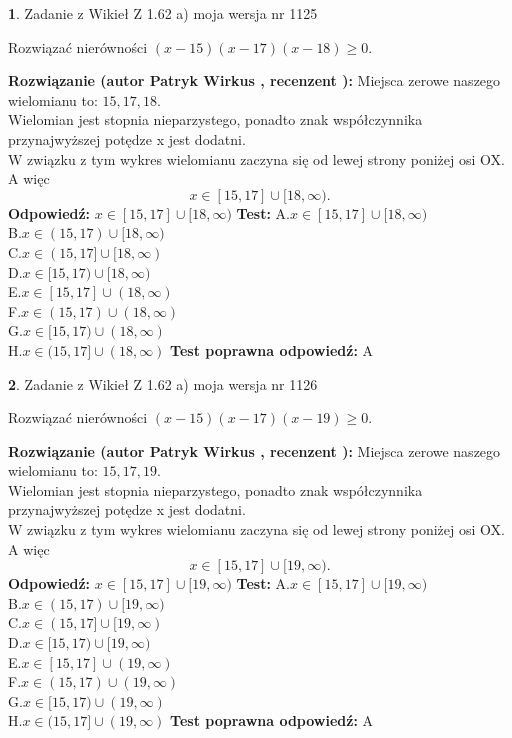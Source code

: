 \documentclass[12pt, a4paper]{article}
\theoremstyle{definition} %
\newtheorem{zad}{}
\newcommand{\zadStart}[1]{\begin{zad}#1\newline}
\newcommand{\zadStop}{\end{zad}}
\newcommand{\rozwStart}[2]{\noindent \textbf{Rozwiązanie (autor #1 , recenzent #2): }\newline}
\newcommand{\rozwStop}{\newline}
\newcommand{\odpStart}{\noindent \textbf{Odpowiedź:}\newline}
\newcommand{\odpStop}{\newline}
\newcommand{\testStart}{\noindent \textbf{Test:}\newline}
\newcommand{\testStop}{\newline}
\newcommand{\kluczStart}{\noindent \textbf{Test poprawna odpowiedź:}\newline}
\newcommand{\kluczStop}{\newline}
\begin{document}
\zadStart{Zadanie z Wikieł Z 1.62 a) moja wersja nr 1125}

Rozwiązać nierówności $(x-15)(x-17)(x-18)\ge0$.
\zadStop
\rozwStart{Patryk Wirkus}{}
Miejsca zerowe naszego wielomianu to: $15, 17, 18$.\\
Wielomian jest stopnia nieparzystego, ponadto znak współczynnika przy\linebreak najwyższej potędze x jest dodatni.\\ W związku z tym wykres wielomianu zaczyna się od lewej strony poniżej osi OX. A więc $$x \in [15,17] \cup [18,\infty).$$
\rozwStop
\odpStart
$x \in [15,17] \cup [18,\infty)$
\odpStop
\testStart
A.$x \in [15,17] \cup [18,\infty)$\\
B.$x \in (15,17) \cup [18,\infty)$\\
C.$x \in (15,17] \cup [18,\infty)$\\
D.$x \in [15,17) \cup [18,\infty)$\\
E.$x \in [15,17] \cup (18,\infty)$\\
F.$x \in (15,17) \cup (18,\infty)$\\
G.$x \in [15,17) \cup (18,\infty)$\\
H.$x \in (15,17] \cup (18,\infty)$
\testStop
\kluczStart
A
\kluczStop



\zadStart{Zadanie z Wikieł Z 1.62 a) moja wersja nr 1126}

Rozwiązać nierówności $(x-15)(x-17)(x-19)\ge0$.
\zadStop
\rozwStart{Patryk Wirkus}{}
Miejsca zerowe naszego wielomianu to: $15, 17, 19$.\\
Wielomian jest stopnia nieparzystego, ponadto znak współczynnika przy\linebreak najwyższej potędze x jest dodatni.\\ W związku z tym wykres wielomianu zaczyna się od lewej strony poniżej osi OX. A więc $$x \in [15,17] \cup [19,\infty).$$
\rozwStop
\odpStart
$x \in [15,17] \cup [19,\infty)$
\odpStop
\testStart
A.$x \in [15,17] \cup [19,\infty)$\\
B.$x \in (15,17) \cup [19,\infty)$\\
C.$x \in (15,17] \cup [19,\infty)$\\
D.$x \in [15,17) \cup [19,\infty)$\\
E.$x \in [15,17] \cup (19,\infty)$\\
F.$x \in (15,17) \cup (19,\infty)$\\
G.$x \in [15,17) \cup (19,\infty)$\\
H.$x \in (15,17] \cup (19,\infty)$
\testStop
\kluczStart
A
\kluczStop
\end{document}
